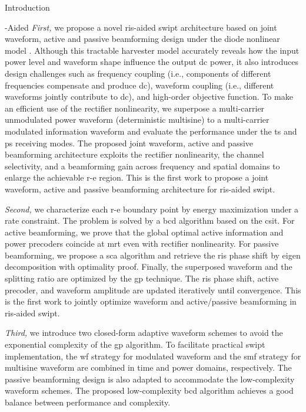 \begin{section}{Introduction}
\begin{subsection}{-Aided }
		\emph{First,} we propose a novel \gls{ris}-aided \gls{swipt} architecture based on joint waveform, active and passive beamforming design under the diode nonlinear model \cite{Clerckx2016a}. Although this tractable harvester model accurately reveals how the input power level and waveform shape influence the output \gls{dc} power, it also introduces design challenges such as frequency coupling (i.e., components of different frequencies compensate and produce \gls{dc}), waveform coupling (i.e., different waveforms jointly contribute to \gls{dc}), and high-order objective function. To make an efficient use of the rectifier nonlinearity, we superpose a multi-carrier unmodulated power waveform (deterministic multisine) to a multi-carrier modulated information waveform and evaluate the performance under the \gls{ts} and \gls{ps} receiving modes. The proposed joint waveform, active and passive beamforming architecture exploits the rectifier nonlinearity, the channel selectivity, and a beamforming gain across frequency and spatial domains to enlarge the achievable \gls{r-e} region. This is the first work to propose a joint waveform, active and passive beamforming architecture for \gls{ris}-aided \gls{swipt}.

		\emph{Second,} we characterize each \gls{r-e} boundary point by energy maximization under a rate constraint. The problem is solved by a \gls{bcd} algorithm based on the \gls{csit}. For active beamforming, we prove that the global optimal active information and power precoders coincide at \gls{mrt} even with rectifier nonlinearity. For passive beamforming, we propose a \gls{sca} algorithm and retrieve the \gls{ris} phase shift by eigen decomposition with optimality proof. Finally, the superposed waveform and the splitting ratio are optimized by the \gls{gp} technique. The \gls{ris} phase shift, active precoder, and waveform amplitude are updated iteratively until convergence. This is the first work to jointly optimize waveform and active/passive beamforming in \gls{ris}-aided \gls{swipt}.

		\emph{Third,} we introduce two closed-form adaptive waveform schemes to avoid the exponential complexity of the \gls{gp} algorithm. To facilitate practical \gls{swipt} implementation, the \gls{wf} strategy for modulated waveform and the \gls{smf} strategy for multisine waveform are combined in time and power domains, respectively. The passive beamforming design is also adapted to accommodate the low-complexity waveform schemes. The proposed low-complexity \gls{bcd} algorithm achieves a good balance between performance and complexity.


\end{subsection}
\end{section}
